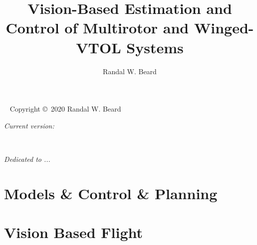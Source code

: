 \documentclass[twoside]{tufte-book}
\title{Vision-Based 
       Estimation and 
       Control of 
       Multirotor and 
       Winged-VTOL Systems}
\author{Randal W. Beard}
\begin{document}
\frontmatter


\maketitle


\newpage
\begin{fullwidth}
~\vfill
\thispagestyle{empty}
\setlength{\parindent}{0pt}
\setlength{\parskip}{\baselineskip}
Copyright \copyright\ 2020 Randal W. Beard

\par{}

\par{}

\par\textit{Current version: \monthyear}
\end{fullwidth}


\cleardoublepage
~\vfill
\begin{doublespace}
\noindent\fontsize{18}{22}\selectfont\itshape
\nohyphenation
Dedicated to ...
\end{doublespace}
\vfill
\vfill

\cleardoublepage

\mainmatter

\setcounter{tocdepth}{2}
\tableofcontents
%







\part{Models \& Control \& Planning}





\part{Vision Based Flight}





\end{document}
